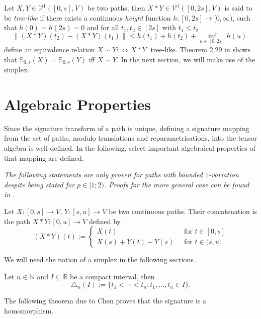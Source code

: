 \documentclass[openany]{book}
\begin{document}
\par Let $X,Y\in \mathscr V^1([0,s],V)$ be two paths, then $X\ast Y\in \mathscr V^1([0,2s], V)$ is said to be \textit{tree-like} if there exists a continuous \textit{height} function $h:[0,2s]\to [0,\infty)$, such that $h(0)=h(2s)=0$ and for all $t_1,t_2\in [2s]$ with $t_1\leq t_2$
\begin{equation*}
    \|(X\ast Y)(t_2)-(X\ast Y)(t_1)\|\leq h(t_1)+h(t_2)+\inf_{u\in [0,2s]} h(u).
\end{equation*}
define an equivalence relation $X\sim Y:\Longleftrightarrow X\ast Y\;\textrm{ tree-like}$. Theorem 2.29 in \cite{lyons2007} shows that $\mathbb S_{0,s}(X)=\mathbb S_{0,s}(Y)$ iff $X\sim Y$.
In the next section, we will make use of the simplex. 
\section{Algebraic Properties}
Since the signature transform of a path is unique, defining a signature mapping from the set of paths, modulo translations and reparametrisations, into the tensor algebra is well-defined. In the following,  select important algebraical properties of that mapping are defined. 
\par \textit{The following statements are only proven for paths with bounded $1$-variation despite being stated for $p\in[1;2)$. Proofs for the more general case can be found in \cite{lyons2022}.}
\begin{definition}
    Let $X:[0,s]\to V$, $Y:[s,u]\to V$ be two continuous paths. Their concatenation is the path $X\ast Y:[0,u]\to V$ defined by
    \begin{equation*}
        (X\ast Y)(t):=\begin{cases}
            X(t)\;&\textrm{ for }t\in [0,s]
            \\ X(s)+Y(t)-Y(s)\;&\textrm{ for }t\in (s,u].
        \end{cases}
    \end{equation*}
\end{definition}
We will need the notion of a simplex in the following sections.
\begin{definition}[Simplex]
    Let $n\in \mathbb N$ and $I\subseteq \mathbb R$ be a compact interval, then
    \begin{equation*}
        \triangle_n(I):=\{t_1<\cdots<t_n: t_1,\dots,t_n\in I\}.
    \end{equation*}
\end{definition}
The following theorem due to Chen proves that the signature is a homomorphism.
\end{document}
